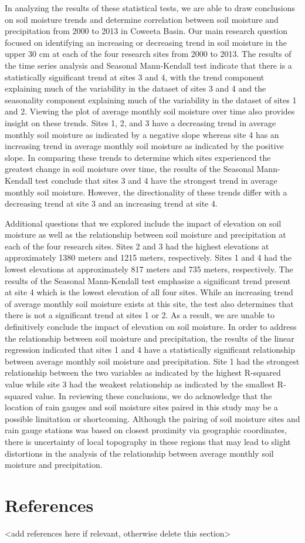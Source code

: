 \documentclass[
  12pt,
]{article}
\begin{document}
In analyzing the results of these statistical tests, we are able to draw
conclusions on soil moisture trends and determine correlation between
soil moisture and precipitation from 2000 to 2013 in Coweeta Basin. Our
main research question focused on identifying an increasing or
decreasing trend in soil moisture in the upper 30 cm at each of the four
research sites from 2000 to 2013. The results of the time series
analysis and Seasonal Mann-Kendall test indicate that there is a
statistically significant trend at sites 3 and 4, with the trend
component explaining much of the variability in the dataset of sites 3
and 4 and the seasonality component explaining much of the variability
in the dataset of sites 1 and 2. Viewing the plot of average monthly
soil moisture over time also provides insight on these trends. Sites 1,
2, and 3 have a decreasing trend in average monthly soil moisture as
indicated by a negative slope whereas site 4 has an increasing trend in
average monthly soil moisture as indicated by the positive slope. In
comparing these trends to determine which sites experienced the greatest
change in soil moisture over time, the results of the Seasonal
Mann-Kendall test conclude that sites 3 and 4 have the strongest trend
in average monthly soil moisture. However, the directionality of these
trends differ with a decreasing trend at site 3 and an increasing trend
at site 4.

Additional questions that we explored include the impact of elevation on
soil moisture as well as the relationship between soil moisture and
precipitation at each of the four research sites. Sites 2 and 3 had the
highest elevations at approximately 1380 meters and 1215 meters,
respectively. Sites 1 and 4 had the lowest elevations at approximately
817 meters and 735 meters, respectively. The results of the Seasonal
Mann-Kendall test emphasize a significant trend present at site 4 which
is the lowest elevation of all four sites. While an increasing trend of
average monthly soil moisture exists at this site, the test also
determines that there is not a significant trend at sites 1 or 2. As a
result, we are unable to definitively conclude the impact of elevation
on soil moisture. In order to address the relationship between soil
moisture and precipitation, the results of the linear regression
indicated that sites 1 and 4 have a statistically significant
relationship between average monthly soil moisture and precipitation.
Site 1 had the strongest relationship between the two variables as
indicated by the highest R-squared value while site 3 had the weakest
relationship as indicated by the smallest R-squared value. In reviewing
these conclusions, we do acknowledge that the location of rain gauges
and soil moisture sites paired in this study may be a possible
limitation or shortcoming. Although the pairing of soil moisture sites
and rain gauge stations was based on closest proximity via geographic
coordinates, there is uncertainty of local topography in these regions
that may lead to slight distortions in the analysis of the relationship
between average monthly soil moisture and precipitation.

\newpage

\hypertarget{references}{%
\section{References}\label{references}}

\textless add references here if relevant, otherwise delete this
section\textgreater{}
\end{document}
